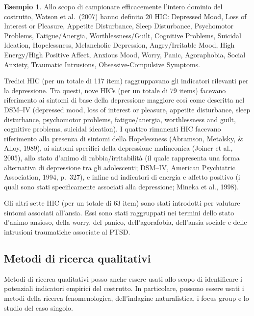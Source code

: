 \documentclass[
  11pt,
]{krantz}
\theoremstyle{definition}
\theoremstyle{definition}
\newtheorem{example}{Esempio}[chapter]
\theoremstyle{definition}
\theoremstyle{definition}
\theoremstyle{remark}
\begin{document}
\begin{example}
Allo scopo di campionare efficacemente l'intero dominio del costrutto, Watson et al.~(2007) hanno definito 20 HIC: Depressed Mood, Loss of Interest or Pleasure, Appetite Disturbance, Sleep Disturbance, Psychomotor Problems, Fatigue/Anergia, Worthlessness/Guilt, Cognitive Problems, Suicidal Ideation, Hopelessness, Melancholic Depression, Angry/Irritable Mood, High Energy/High Positive Affect, Anxious Mood, Worry, Panic, Agoraphobia, Social Anxiety, Traumatic Intrusions, Obsessive-Compulsive Symptoms.

Tredici HIC (per un totale di 117 item) raggruppavano gli indicatori rilevanti per la depressione. Tra questi, nove HICs (per un totale di 79 items) facevano riferimento ai sintomi di base della depressione maggiore così come descritta nel DSM--IV (depressed mood, loss of interest or pleasure, appetite disturbance, sleep disturbance, psychomotor problems, fatigue/anergia, worthlessness and guilt, cognitive problems, suicidal ideation). I quattro rimanenti HIC facevano riferimento alla presenza di sintomi della Hopelessness (Abramson, Metalsky, \& Alloy, 1989), ai sintomi specifici della depressione malinconica (Joiner et al., 2005), allo stato d'animo di rabbia/irritabilità (il quale rappresenta una forma alternativa di depressione tra gli adolescenti; DSM--IV, American Psychiatric Association, 1994, p.~327), e infine ad indicatori di energia e affetto positivo (i quali sono stati specificamente associati alla depressione; Mineka et al., 1998).

Gli altri sette HIC (per un totale di 63 item) sono stati introdotti per valutare sintomi associati all'ansia. Essi sono stati raggruppati nei termini dello stato d'animo ansioso, della worry, del panico, dell'agorafobia, dell'ansia sociale e delle intrusioni traumatiche associate al PTSD.
\end{example}

\hypertarget{metodi-di-ricerca-qualitativi}{%
\subsection{Metodi di ricerca qualitativi}\label{metodi-di-ricerca-qualitativi}}

Metodi di ricerca qualitativi posso anche essere usati allo scopo di identificare i potenziali indicatori empirici del costrutto. In particolare, possono essere usati i metodi della ricerca fenomenologica, dell'indagine naturalistica, i focus group e lo studio del caso singolo.
\end{document}
